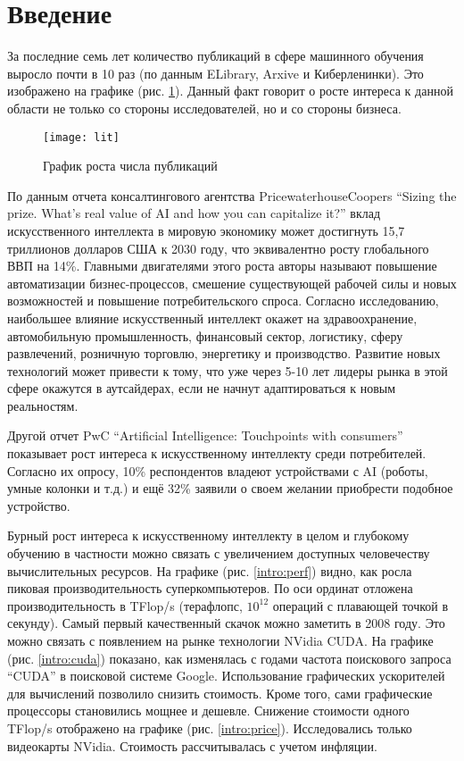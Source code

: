 \clearpage
\section{Введение}
За последние семь лет количество публикаций в сфере машинного обучения выросло почти в 10 раз (по данным ELibrary, Arxive и Киберленинки). Это изображено на графике (рис. \ref{intro:lit}). Данный факт говорит о росте интереса к данной области не только со стороны исследователей, но и со стороны бизнеса.
\par
\begin{figure}[h]
	\centering
	\texttt{[image: lit]}
	\caption{График роста числа публикаций}
	\label{intro:lit}
\end{figure}
\par
По данным отчета консалтингового агентства PricewaterhouseCoopers “Sizing the prize. What’s real value of AI and how you can capitalize it?” вклад искусственного интеллекта в мировую экономику может достигнуть 15,7 триллионов долларов США к 2030 году, что эквивалентно росту глобального ВВП на 14\%. Главными двигателями этого роста авторы называют повышение автоматизации бизнес-процессов, смешение существующей рабочей силы и новых возможностей и повышение потребительского спроса. Согласно исследованию, наибольшее влияние искусственный интеллект окажет на здравоохранение, автомобильную промышленность, финансовый сектор, логистику, сферу развлечений, розничную торговлю, энергетику и производство. Развитие новых технологий может привести к тому, что уже через 5-10 лет лидеры рынка в этой сфере окажутся в аутсайдерах, если не начнут адаптироваться к новым реальностям.
\par
Другой отчет PwC “Artificial Intelligence: Touchpoints with consumers” показывает рост интереса к искусственному интеллекту среди потребителей. Согласно их опросу, 10\% респондентов владеют устройствами с AI (роботы, умные колонки и т.д.) и ещё 32\% заявили о своем желании приобрести подобное устройство.
\par
Бурный рост интереса к искусственному интеллекту в целом и глубокому обучению в частности можно связать с увеличением доступных человечеству вычислительных ресурсов. На графике (рис. \ref{intro:perf}) видно, как росла пиковая производительность суперкомпьютеров. По оси ординат отложена производительность в TFlop/s (терафлопс, $10^12$ операций с плавающей точкой в секунду). Самый первый качественный скачок можно заметить в 2008 году. Это можно связать с появлением на рынке технологии NVidia CUDA. На графике (рис. \ref{intro:cuda}) показано, как изменялась с годами частота поискового запроса “CUDA” в поисковой системе Google. Использование графических ускорителей для вычислений позволило снизить стоимость. Кроме того, сами графические процессоры становились мощнее и дешевле. Снижение стоимости одного TFlop/s отображено на графике (рис. \ref{intro:price}). Исследовались только видеокарты NVidia. Стоимость рассчитывалась с учетом инфляции.
